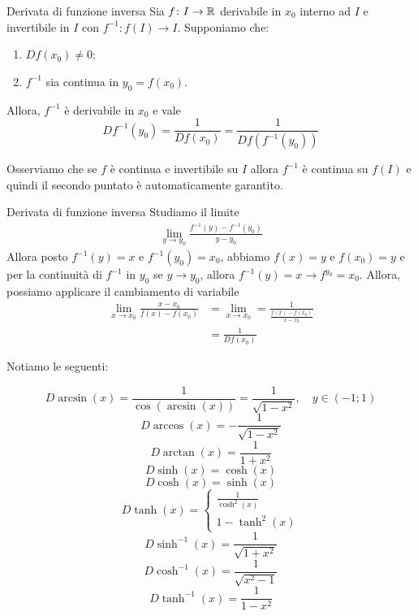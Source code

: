 \documentclass[a4paper]{article}
\begin{document}
\begin{radioactive}
\begin{snippettheorem}{Derivata di funzione inversa}
    Sia \(f\colon I \to \mathbb{R}\) derivabile in \(x_0\)
    interno ad \(I\) e invertibile in \(I\) con \(f^{-1} \colon f(I) \to I\).
    Supponiamo che:
    \begin{enumerate}
        \item \(Df(x_0) \neq 0\);
        \item \(f^{-1}\) sia continua in \(y_0 = f(x_0)\).
    \end{enumerate}
    Allora, \(f^{-1}\) è derivabile in \(x_0\) e vale
    \[
        Df^{-1}(y_0) = \frac{1}{Df(x_0)}
        = \frac{1}{Df(f^{-1}(y_0))}
    \]
\end{snippettheorem}

Osserviamo che se \(f\) è continua e invertibile su \(I\) allora \(f^{-1}\)
è continua su \(f(I)\) e quindi il secondo puntato è automaticamente garantito.

\begin{snippetproof}{Derivata di funzione inversa}
    Studiamo il limite
    \begin{align*}
        \lim_{y\to y_0} \frac{f^{-1}(y) - f^{-1}(y_0)}{y-y_0}
    \end{align*}
    Allora posto \(f^{-1}(y) = x\) e \(f^{-1}(y_0) = x_0\),
    abbiamo \(f(x) = y\) e \(f(x_0) = y\) e per la continuità
    di \(f^{-1}\) in \(y_0\) se \(y\to y_0\),
    allora \(f^{-1}(y) = x \to f^{y_0} = x_0\).
    Allora, possiamo applicare il cambiamento di variabile
    \begin{align*}
        \lim_{x\to x_0} \frac{x-x_0}{f(x) - f(x_0)}
        &= \lim_{x\to x_0} = \frac{1}{\frac{f(x) - f(x_0)}{x-x_0}} \\
        &= \frac{1}{Df(x_0)}
    \end{align*}
\end{snippetproof}
\end{radioactive}

\pagebreak

Notiamo le seguenti:

\[
    D\arcsin(x) = \frac{1}{\cos(\arcsin(x))}
    = \frac{1}{\sqrt{1 - x^2}}, \quad y \in (-1;1)
\]
\[
    D\arccos(x) = -\frac{1}{\sqrt{1 - x^2}}
\]
\[
    D\arctan(x) = \frac{1}{1+x^2}
\]
\[
    D\sinh(x) = \cosh(x)
\]
\[
    D\cosh(x) = \sinh(x)
\]
\[
    D\tanh(x) = \begin{cases}
        \frac{1}{\cosh^2(x)} \\
        1 - \tanh^2(x)
    \end{cases}
\]
\[
    D\sinh^{-1}(x) = \frac{1}{\sqrt{1 + x^2}}
\]
\[
    D\cosh^{-1}(x) = \frac{1}{\sqrt{x^2 - 1}}
\]
\[
    D\tanh^{-1}(x) = \frac{1}{1-x^2}
\]
\end{document}
